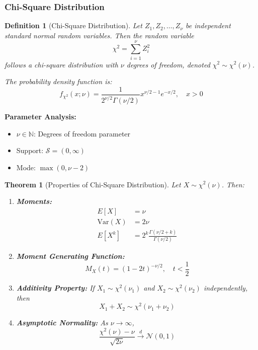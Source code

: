 \documentclass[12pt,a4paper]{article}
\newtheorem{theorem}{Theorem}[section]
\newtheorem{definition}{Definition}[section]
\theoremstyle{remark}
\begin{document}
\subsubsection{Chi-Square Distribution}

\begin{definition}[Chi-Square Distribution]
Let $Z_1, Z_2, \ldots, Z_\nu$ be independent standard normal random variables. Then the random variable
$$\chi^2 = \sum_{i=1}^{\nu} Z_i^2$$
follows a chi-square distribution with $\nu$ degrees of freedom, denoted $\chi^2 \sim \chi^2(\nu)$.

The probability density function is:
$$f_{\chi^2}(x; \nu) = \frac{1}{2^{\nu/2}\Gamma(\nu/2)} x^{\nu/2-1} e^{-x/2}, \quad x > 0$$
\end{definition}

\textbf{Parameter Analysis:}
\begin{itemize}
\item $\nu \in \mathbb{N}$: Degrees of freedom parameter
\item Support: $\mathcal{S} = (0, \infty)$
\item Mode: $\max(0, \nu - 2)$
\end{itemize}

\begin{theorem}[Properties of Chi-Square Distribution]
Let $X \sim \chi^2(\nu)$. Then:
\begin{enumerate}
\item \textbf{Moments:}
   \begin{align}
   E[X] &= \nu\\
   \text{Var}(X) &= 2\nu\\
   E[X^k] &= 2^k \frac{\Gamma(\nu/2 + k)}{\Gamma(\nu/2)}
   \end{align}
\item \textbf{Moment Generating Function:}
   $$M_X(t) = (1 - 2t)^{-\nu/2}, \quad t < \frac{1}{2}$$
\item \textbf{Additivity Property:} If $X_1 \sim \chi^2(\nu_1)$ and $X_2 \sim \chi^2(\nu_2)$ independently, then
   $$X_1 + X_2 \sim \chi^2(\nu_1 + \nu_2)$$
\item \textbf{Asymptotic Normality:} As $\nu \to \infty$,
   $$\frac{\chi^2(\nu) - \nu}{\sqrt{2\nu}} \stackrel{d}{\to} \mathcal{N}(0,1)$$
\end{enumerate}
\end{theorem}
\end{document}
